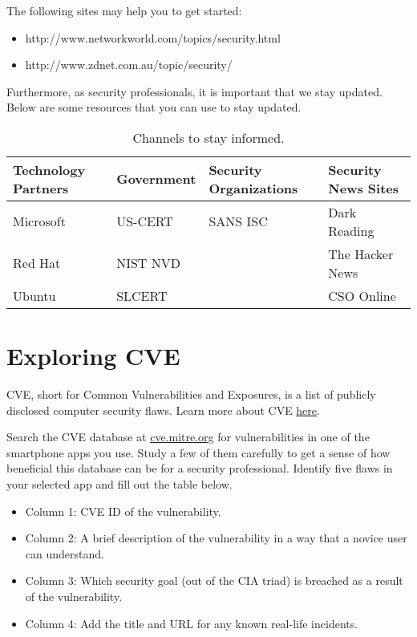 \documentclass[11pt,letterpaper]{article}
\begin{document}
The following sites may help you to get started:
\begin{itemize}
    \item http://www.networkworld.com/topics/security.html
    \item http://www.zdnet.com.au/topic/security/ 
\end{itemize}

Furthermore, as security professionals, it is important that we stay updated. Below are some resources that you can use to stay updated. 

\begin{table}[htbp]
    \caption{Channels to stay informed.
    }
    \begin{tabularx}{\columnwidth}{|X|X|X|X|}
        \hline
        \textbf{Technology Partners} & \textbf{Government}       & \textbf{Security Organizations} & \textbf{Security News Sites}  \\
        
        \hline
        Microsoft & 
        US-CERT & 
        SANS ISC &
        Dark Reading
        \\ \hline
        
        \hline
        Red Hat & 
        NIST NVD & 
        &
        The Hacker News
        \\ \hline
        
        \hline
        Ubuntu & 
        SLCERT &
        &
        CSO Online
        \\ \hline
    \end{tabularx}
\end{table}


\section*{Exploring CVE}
%

CVE, short for Common Vulnerabilities and Exposures, is a list of publicly disclosed computer security flaws. Learn more about CVE \href{https://www.redhat.com/en/topics/security/what-is-cve}{here}. 

Search the CVE database at \href{https://cve.mitre.org/}{cve.mitre.org} for vulnerabilities in one of the smartphone apps you use. Study a few of them carefully to get a sense of how beneficial this database can be for a security professional. Identify five flaws in your selected app and fill out the table below. 

\begin{itemize}
    \item Column 1: CVE ID of the vulnerability.
    \item Column 2: A brief description of the vulnerability in a way that a novice user can understand.
    \item Column 3: Which security goal (out of the CIA triad) is breached as a result of the vulnerability.
    \item Column 4: Add the title and URL for any known real-life incidents.
\end{itemize}
\end{document}
